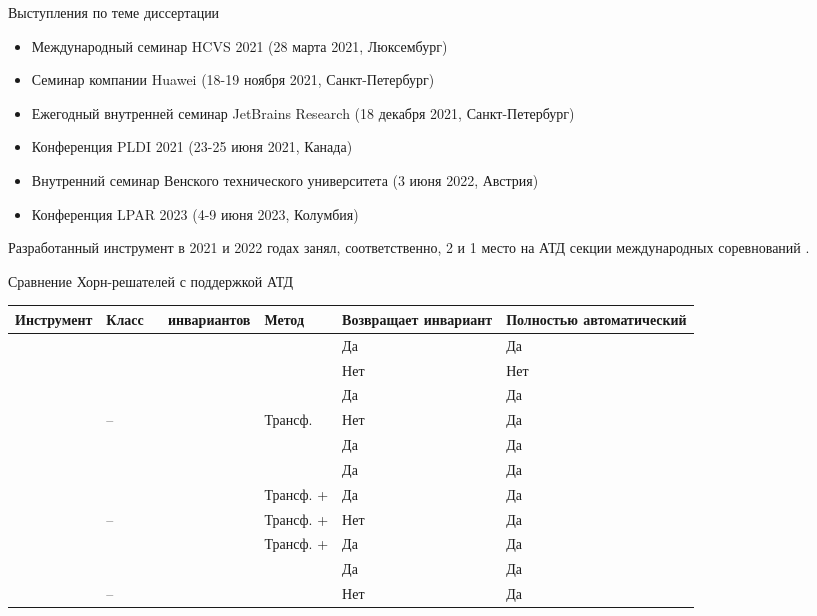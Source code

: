 \documentclass[22pt,aspectratio=169]{beamer}
\begin{document}
\begin{frame}{Выступления по теме диссертации}
\begin{itemize}
\item Международный семинар HCVS 2021 (28 марта 2021, Люксембург)
\item Семинар компании Huawei (18-19 ноября 2021, Санкт-Петербург)
\item Ежегодный внутренней семинар JetBrains Research (18 декабря 2021, Санкт-Петербург)
\item Конференция PLDI 2021 (23-25 июня 2021, Канада)
\item Внутренний семинар Венского технического университета (3 июня 2022, Австрия)
\item Конференция LPAR 2023 (4-9 июня 2023, Колумбия)
\end{itemize}

Разработанный инструмент в 2021 и 2022 годах занял, соответственно, 2 и 1 место на АТД секции международных соревнований \chccomp{}.
\end{frame}

\begin{frame}{Сравнение Хорн-решателей с поддержкой АТД}
\begin{table}
\centering\footnotesize
\begin{tabular}{| m{38mm} || x{18mm} | x{18mm} | x{18mm} | x{23mm} |}
\hline
Инструмент & Класс\quad\ \ \  инвариантов & Метод & Возвращает инвариант & Полностью автоматический\\\hline\hline
\spacer{} & \elemclass{} & \pdr{} & Да & Да\\
\racer{} & \catelemclass{} & \pdr{} & Нет & Нет\\
\eldarica{} & \sizeelemclass{} & \cegar{} & Да & Да\\
\vericat{} & -- & Трансф. & Нет & Да\\
\hoice{} & \elemclass{} & \ice{} & Да & Да\\
\rchc{}  & \syncRegFlatClass{} & \ice{} & Да & Да\\\hline
\ringen{\cvc} & \regclass{} & Трансф. + \fmf{} & Да & Да\\
\ringen{\vampire} & -- & Трансф. + \satur{} & Нет & Да\\
\ringenSync{} & \syncRegFullClass{} & Трансф. + \fmf{} & Да & Да\\
\ringenCICI{\cvc} & \regelemclass{} & \ourCEGAR{} & Да & Да\\
\ringenCICI{\vampire} & -- & \ourCEGAR{} & Нет & Да\\
\hline
\end{tabular}
\end{table}
\end{frame}
\end{document}
